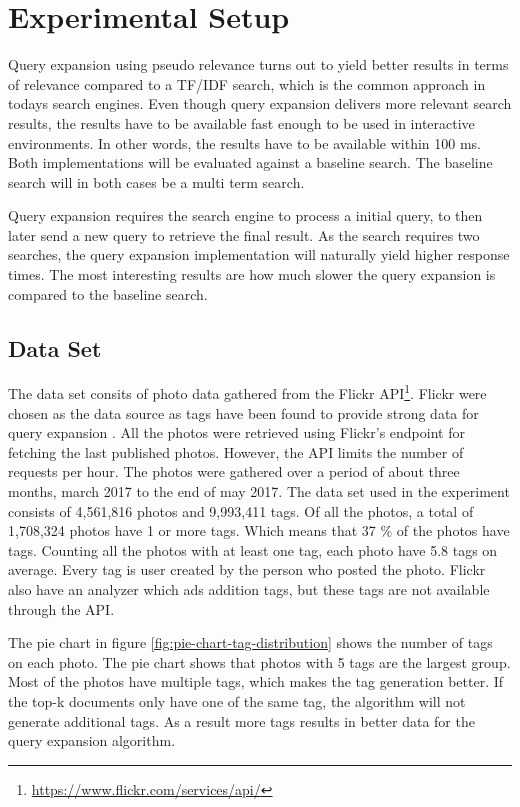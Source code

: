 \section{Experimental Setup}
Query expansion using pseudo relevance turns out to yield better results in terms of relevance compared to a TF/IDF search,
which is the common approach in todays search engines.
Even though query expansion delivers more relevant search results,
the results have to be available fast enough to be used in interactive environments.
In other words, the results have to be available within 100 ms.
Both implementations will be evaluated against a baseline search.
The baseline search will in both cases be a multi term search.

Query expansion requires the search engine to process a initial query,
to then later send a new query to retrieve the final result.
As the search requires two searches,
the query expansion implementation will naturally yield higher response times.
The most interesting results are how much slower the query expansion is compared to the baseline search.

\subsection{Data Set}
\label{sec:dataset}
The data set consits of photo data gathered from the Flickr API\footnote{\url{https://www.flickr.com/services/api/}}.
Flickr were chosen as the data source as tags have been found to provide strong data for query expansion \cite{ir-hashtag}.
All the photos were retrieved using Flickr's endpoint for fetching the last published photos.
However, the API limits the number of requests per hour.
The photos were gathered over a period of about three months, march 2017 to the end of may 2017.
The data set used in the experiment consists of 4,561,816 photos and 9,993,411 tags.
Of all the photos, a total of 1,708,324 photos have 1 or more tags.
Which means that 37 \% of the photos have tags.
Counting all the photos with at least one tag,
each photo have 5.8 tags on average.
Every tag is user created by the person who posted the photo.
Flickr also have an analyzer which ads addition tags,
but these tags are not available through the API.

The pie chart in figure \ref{fig:pie-chart-tag-distribution} shows the number of tags on each photo.
The pie chart shows that photos with 5 tags are the largest group.
Most of the photos have multiple tags,
which makes the tag generation better.
If the top-k documents only have one of the same tag,
the algorithm will not generate additional tags.
As a result more tags results in better data for the query expansion algorithm.

